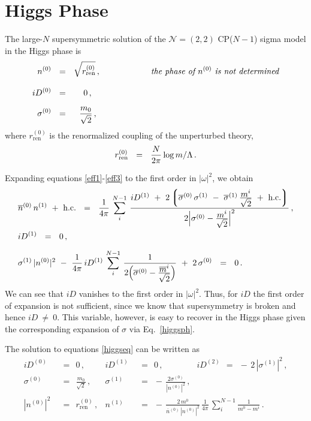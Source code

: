 \documentclass[12pt]{article}
\newcommand{\ntwot}{${\mathcal N}= \left(2,2\right) $ }
\newcommand{\ov}{\overline}
\newcommand{\lgr}{\left\lgroup}
\newcommand{\rgr}{\right\rgroup}
\newcommand{\nz}{{n^{(0)}}}
\newcommand{\no}{{n^{(1)}}}
\newcommand{\bnz}{{\ov{n}{}^{(0)}}}
\newcommand{\Dz}{{D^{(0)}}}
\newcommand{\Do}{{D^{(1)}}}
\newcommand{\sigz}{{\sigma^{(0)}}}
\newcommand{\sigo}{{\sigma^{(1)}}}
\newcommand{\bsigz}{{\ov{\sigma}{}^{(0)}}}
\newcommand{\bsigo}{{\ov{\sigma}{}^{(1)}}}
\newcommand{\rrenz}{{r_\text{ren}^{(0)}}}
\begin{document}
\section{Higgs Phase}

	The large-$N$ supersymmetric solution of the \ntwot CP($N-1$) sigma model
	in the Higgs phase is
\begin{align*}
%
	\nz & ~~=~~ \sqrt{\rrenz}\,,   \qquad\qquad\qquad\text{\it the phase of $\nz$ is not determined}\\[3mm]
%
	i\Dz & ~~=~~ ~~~\,0\,, \\[2mm]
%
	\sigz & ~~=~~ ~~\frac{m_0}{\sqrt{2}}\,,
\end{align*}
	where $ \rrenz $ is the renormalized coupling of the unperturbed theory,
\[
	\rrenz ~~=~~ \frac{N}{2\pi}\,{\rm log}\,m/\Lambda\,.
\]

	Expanding equations \eqref{eff1}-\eqref{eff3} to the first order in $|\omega|^2$, we obtain
\begin{align}
%
\notag
	&
	\bnz\,\no ~+~ \text{h.c.} ~~=~~
	\frac{1}{4\pi}\, \sum_{i}^{N-1}\, 
		\frac{ i\Do ~+~ 2\lgr \bsigz\, \sigo ~-~ \bsigo\,\frac{\displaystyle m^i}{\displaystyle \sqrt{2}}
				~+~ \text{h.c.} \rgr }
			{ 2 \Bigl| \sigz - \frac{\displaystyle m^i}{\sqrt{\displaystyle 2}} \Bigr|^2 }\,, \\
%
\label{higgseq}
	&
	i\Do ~~=~~ 0\,, \\[2mm]
%
\notag
	&
	\sigo\,|\nz|^2  ~-~ 
	\frac{1}{4\pi}\,i\Do\, \sum_{i}^{N-1}\, \frac{1}
				{2\Bigl( \bsigz - \frac{\displaystyle \ov{m}{}^i}{\displaystyle \sqrt{2}} \Bigr) }
	~+~ 2\,\sigz ~~=~~ 0\,.
\end{align}
	We can see that $ iD $ vanishes to the first order in $ |\omega|^2 $.
	Thus, for $ iD $ the first order of expansion is not sufficient, since we know that supersymmetry
	is broken and hence $ iD ~\neq~ 0 $.
	This variable, however, is easy to recover in the Higgs phase given the corresponding expansion of $ \sigma $
	via Eq.~\eqref{higgsph}.

	The solution to equations \eqref{higgseq} can be written as
\begin{align*}
%
	i \Dz & ~~=~~ 0\,,                     &       i\Do & ~~=~~ 0\,,  
			\qquad\qquad iD^{(2)} ~~=~~ -\,2\,|\sigo|^2\,, \\[3mm]
%
	\sigz & ~~=~~ \frac{m_0}{\sqrt{2}}\,,  &       \sigo & ~~=~~ -\,\frac{2\sigz}{|\nz|^2}\,, \\[3mm]
%
	|\nz|^2 & ~~=~~ \rrenz\,,              &    
			\no & ~~=~~ -\,\frac{2\,m^0}{\bnz\,|\nz|^2}\,\frac{1}{4\pi}\,
					\sum_{i}^{N-1} \frac{1}{m^0 - m^i}\,.
\end{align*}	
\end{document}
